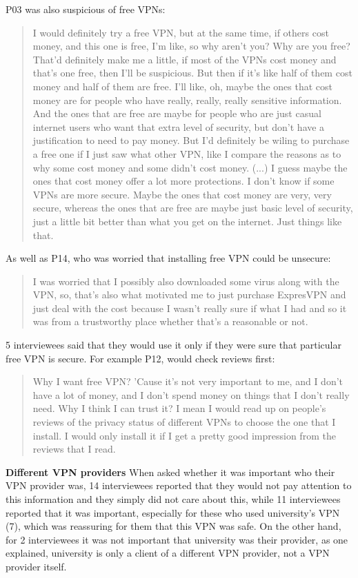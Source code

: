 P03 was also suspicious of free VPNs: \begin{quote}I would definitely try a
free VPN, but at the same time, if others cost money, and this one is free,
I'm like, so why aren't you? Why are you free? That'd definitely make me a
little, if most of the VPNs cost money and that's one free, then I'll be
suspicious. But then if it's like half of them cost money and half of them are
free. I'll like, oh, maybe the ones that cost money are for people who have
really, really, really sensitive information. And the ones that are free are
maybe for people who are just casual internet users who want that extra level
of security, but don't have a justification to need to pay money. But I'd
definitely be wiling to purchase a free one if I just saw what other VPN, like
I compare the reasons as to why some cost money and some didn't cost money.
(...) I guess maybe the ones that cost money offer a lot more protections. I
don't know if some VPNs are more secure. Maybe the ones that cost money are
very, very secure, whereas the ones that are free are maybe just basic level
of security, just a little bit better than what you get on the internet. Just
things like that.\end{quote}

As well as P14, who was worried that installing free VPN could be unsecure:
\begin{quote}I was worried that I possibly also downloaded some virus along
with the VPN, so, that's also what motivated me to just purchase ExpresVPN and
just deal with the cost because I wasn't really sure if what I had and so it
was from a trustworthy place whether that's a reasonable or not.\end{quote}

5 interviewees said that they would use it only if they were sure that
particular free VPN is secure. For example P12, would check reviews first:
\begin{quote}Why I want free VPN? 'Cause it's not very important to me, and I
don't have a lot of money, and I don't spend money on things that I don't
really need. Why I think I can trust it? I mean I would read up on people's
reviews of the privacy status of different VPNs to choose the one that I
install. I would only install it if I get a pretty good impression from the
reviews that I read.\end{quote}

\textbf{Different VPN providers} When asked whether it was important who their
VPN provider was, 14 interviewees reported that they would not pay attention
to this information and they simply did not care about this, while 11
interviewees reported that it was important, especially for these who used
university’s VPN (7), which was reassuring for them that this VPN was safe. On
the other hand, for 2 interviewees it was not important that university was
their provider, as one explained, university is only a client of a different
VPN provider, not a VPN provider itself. 


